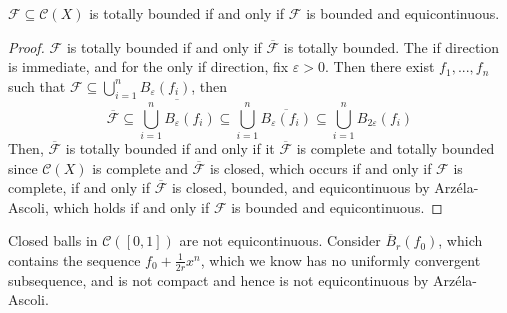 \begin{corollary}
    $\mathcal{F} \subseteq \mathcal{C}(X)$ is totally bounded if and only if $\mathcal{F}$ is bounded and equicontinuous.
\end{corollary}
\begin{proof}
    $\mathcal{F}$ is totally bounded if and only if $\overline{\mathcal{F}}$ is totally bounded. The if direction is immediate, and for the only if direction, fix $\varepsilon > 0$. Then there exist $f_1,...,f_n$ such that $\mathcal{F} \subseteq \bigcup_{i=1}^nB_{\varepsilon}(f_i)$, then $$\overline{\mathcal{F}} \subseteq \overline{\bigcup_{i=1}^nB_{\varepsilon}(f_i)} \subseteq \bigcup_{i=1}^n\overline{B_{\varepsilon}(f_i)} \subseteq \bigcup_{i=1}^nB_{2\varepsilon}(f_i)$$
    Then, $\overline{\mathcal{F}}$ is totally bounded if and only if it $\overline{\mathcal{F}}$ is complete and totally bounded since $\mathcal{C}(X)$ is complete and $\overline{\mathcal{F}}$ is closed, which occurs if and only if $\mathcal{F}$ is complete, if and only if $\overline{\mathcal{F}}$ is closed, bounded, and equicontinuous by Arz\'{e}la-Ascoli, which holds if and only if $\mathcal{F}$ is bounded and equicontinuous.
\end{proof}

\begin{example}
    Closed balls in $\mathcal{C}([0,1])$ are not equicontinuous. Consider $\overline{B}_r(f_0)$, which contains the sequence $f_0+\frac{1}{2r}x^n$, which we know has no uniformly convergent subsequence, and is not compact and hence is not equicontinuous by Arz\'{e}la-Ascoli.
\end{example}


